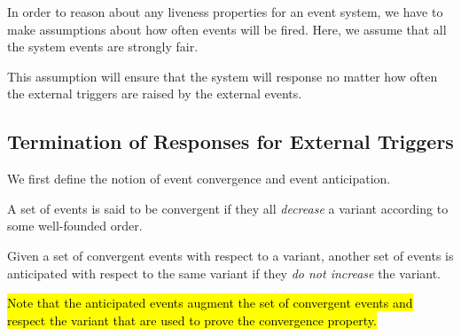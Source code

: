 In order to reason about any liveness properties for an event system,
we have to make assumptions about how often events will be fired.
Here, we assume that all the system events are strongly fair.
\begin{assumption}
  \label{asm:SF}
\end{assumption}
This assumption will ensure that the system will response no matter
how often the external triggers are raised by the external events.

\subsection{Termination of Responses for External Triggers}
\label{sec:contr-rema-resp}

We first define the notion of event convergence and event
anticipation.
\begin{definition}
  \label{def:conv}
  A set of events is said to be convergent if they all \emph{decrease}
  a variant according to some well-founded order.
\end{definition}

\begin{definition}
  \label{def:anticipated}
  Given a set of convergent events with respect to a variant,
  another set of events is anticipated with respect to the
  same variant if they \emph{do not increase} the variant.
\end{definition}
\hl{%
  Note that the anticipated events augment the set of convergent
  events and respect the variant that are used to prove the
  convergence property.%
}

